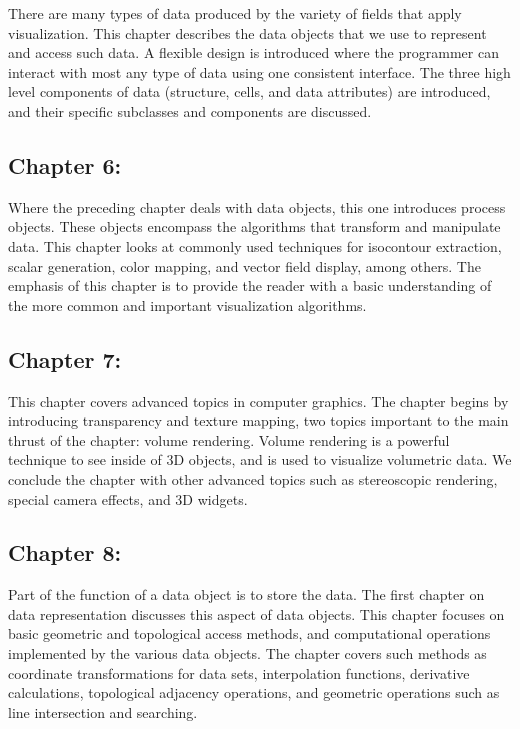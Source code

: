 There are many types of data produced by the variety of fields that apply visualization. This chapter describes the data objects that we use to represent and access such data. A flexible design is introduced where the programmer can interact with most any type of data using one consistent interface. The three high level components of data (structure, cells, and data attributes) are introduced, and their specific subclasses and components are discussed.

\subsection*{Chapter 6: }

Where the preceding chapter deals with data objects, this one introduces process objects. These objects encompass the algorithms that transform and manipulate data. This chapter looks at commonly used techniques for isocontour extraction, scalar generation, color mapping, and vector field display, among others. The emphasis of this chapter is to provide the reader with a basic understanding of the more common and important visualization algorithms.

\subsection*{Chapter 7:  }

This chapter covers advanced topics in computer graphics. The chapter begins by introducing transparency and texture mapping, two topics important to the main thrust of the chapter: volume rendering. Volume rendering is a powerful technique to see inside of 3D objects, and is used to visualize volumetric data. We conclude the chapter with other advanced topics such as stereoscopic rendering, special camera effects, and 3D widgets.

\subsection*{Chapter 8: }

Part of the function of a data object is to store the data. The first chapter on data representation discusses this aspect of data objects. This chapter focuses on basic geometric and topological access methods, and computational operations implemented by the various data objects. The chapter covers such methods as coordinate transformations for data sets, interpolation functions, derivative calculations, topological adjacency operations, and geometric operations such as line intersection and searching.


